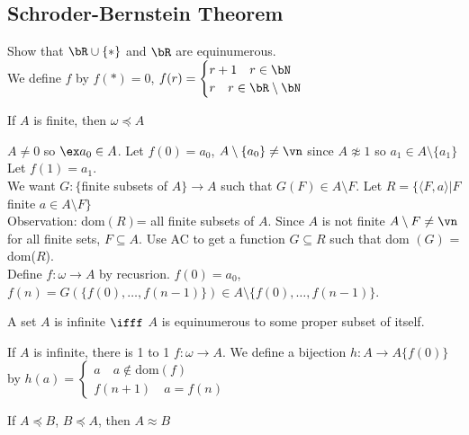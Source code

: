 
\subsection{Schroder-Bernstein Theorem}

\begin{example}
    Show that $\bR \cup \{*\}$ and $\bR$ are equinumerous. \\
    We define $f$ by $f(*)=0$, $f(r) = \begin{cases} r+1 \quad r \in \bN \\ r \quad r \in \bR \setminus \bN \end{cases}$
\end{example}

\begin{lemma}
    If $A$ is finite, then $\omega \preceq A$ 
\end{lemma}

\begin{pf}
    $A \neq 0$ so $\ex a_0 \in A$. Let $f(0) = a_0$, $A \setminus \{a_0\} \neq \vn$ since $A \not\approx 1$ so $a_1 \in A \setminus \{a_1\}$ Let $f(1)=a_1$.\\
     We want $G: \{$finite subsets of $A \} \to A$ such that $G(F) \in A \setminus F$. Let $R =\{ \langle F, a \rangle | F$ finite $a \in A \setminus F\}$ \\
     Observation: dom$(R)$= all finite subsets of $A$. Since $A$ is not finite $A \setminus F \neq \vn$ for all finite sets, $F \subseteq A$. Use AC to get a function $G \subseteq R$ such that dom $(G)$ = dom($R$). \\
     Define $f : \omega \to A$ by recusrion. $f(0)=a_0$, $f(n) = G(\{f(0), \ldots, f(n-1)\}) \in A \setminus \{f(0), \ldots, f(n-1)\}$.   
\end{pf}

\begin{corollary}
    A set $A$ is infinite $\ifff$ $A$ is equinumerous to some proper subset of itself. 
\end{corollary}

\noindent
If $A$ is infinite, there is 1 to 1 $f: \omega \to A$. We define a bijection $h: A \to A\{f(0)\}$ by $h(a) = \begin{cases}a \quad a \not\in \text{dom}(f) \\ f(n+1) \quad a=f(n) \end{cases}$

\begin{theorem}
    If $A \preceq B$, $B \preceq A$, then $A \approx B$ 
\end{theorem}

